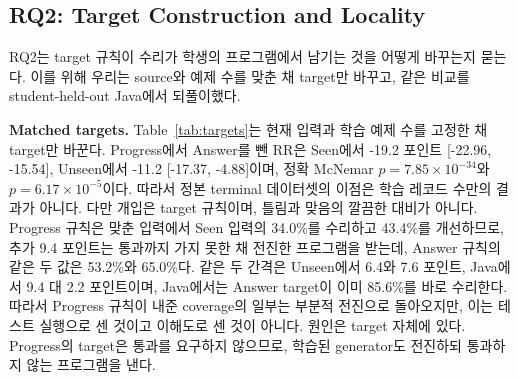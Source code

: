 \documentclass[10pt,conference]{IEEEtran}
\begin{document}
\subsection{RQ2: Target Construction and Locality}
\label{sec:rq-locality}

RQ2는 target 규칙이 수리가 학생의 프로그램에서 남기는 것을 어떻게 바꾸는지 묻는다. 이를 위해 우리는 source와 예제 수를 맞춘 채 target만 바꾸고, 같은 비교를 student-held-out Java에서 되풀이했다.

\noindent\textbf{Matched targets.} Table~\ref{tab:targets}는 현재 입력과 학습 예제 수를 고정한 채 target만 바꾼다. Progress에서 Answer를 뺀 RR은 Seen에서 -19.2 포인트 [-22.96, -15.54], Unseen에서 -11.2 [-17.37, -4.88]이며, 정확 McNemar \(p=7.85\times10^{-34}\)와 \(p=6.17\times10^{-5}\)이다. 따라서 정본 terminal 데이터셋의 이점은 학습 레코드 수만의 결과가 아니다. 다만 개입은 target 규칙이며, 틀림과 맞음의 깔끔한 대비가 아니다. Progress 규칙은 맞춘 입력에서 Seen 입력의 34.0\%를 수리하고 43.4\%를 개선하므로, 추가 9.4 포인트는 통과까지 가지 못한 채 전진한 프로그램을 받는데, Answer 규칙의 같은 두 값은 53.2\%와 65.0\%다. 같은 두 간격은 Unseen에서 6.4와 7.6 포인트, Java에서 9.4 대 2.2 포인트이며, Java에서는 Answer target이 이미 85.6\%를 바로 수리한다. 따라서 Progress 규칙이 내준 coverage의 일부는 부분적 전진으로 돌아오지만, 이는 테스트 실행으로 센 것이고 이해도로 센 것이 아니다. 원인은 target 자체에 있다. Progress의 target은 통과를 요구하지 않으므로, 학습된 generator도 전진하되 통과하지 않는 프로그램을 낸다.
\end{document}
